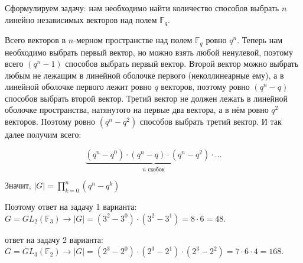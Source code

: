 \documentclass[]{book}
\theoremstyle{definition}
\begin{document}
\begin{enumerate}[resume]
Сформулируем задачу: нам необходимо найти количество способов выбрать $n$ линейно независимых векторов над полем $\mathbb{F}_q$.

Всего векторов в $n$-мерном пространстве над полем $\mathbb{F}_q$ ровно $q^n$. Теперь нам необходимо выбрать первый вектор, но можно взять любой ненулевой, поэтому всего $\left( q^n - 1 \right)$ способов выбрать первый вектор. Второй вектор можно выбрать любым не лежащим в линейной оболочке первого (неколлинеарные ему), а в линейной оболочке первого лежит ровно $q$ векторов, поэтому ровно $\left( q^n - q \right)$ способов выбрать второй вектор. Третий вектор не должен лежать в линейной оболочке пространства, натянутого на первые два вектора, а в нём ровно $q^2$ векторов. Поэтому ровно $\left( q^n - q^2 \right)$ способов выбрать третий вектор. И так далее получим всего:

$$\underbrace{\left( q^n - q^0 \right)\cdot \left( q^n - q \right)\cdot \left( q^n - q^2 \right)\cdot\ldots}_{n \text{ скобок}}$$

Значит, $|G| = \prod\limits_{k = 0}^{n}\left(q^n - q^k \right) $

Поэтому ответ на задачу 1 варианта: $G = GL_2(\mathbb{F}_3) \rightarrow |G| = \left(3^2 - 3^0\right)\cdot\left(3^2 - 3^1\right) = 8\cdot 6 = 48 $.

ответ на задачу 2 варианта: $G = GL_3(\mathbb{F}_2) \rightarrow |G| = \left(2^3 - 2^0\right)\cdot\left(2^3 - 2^1\right)\cdot\left(2^3 - 2^2\right)  = 7\cdot 6\cdot 4 = 168$.



\end{enumerate}
\end{document}
